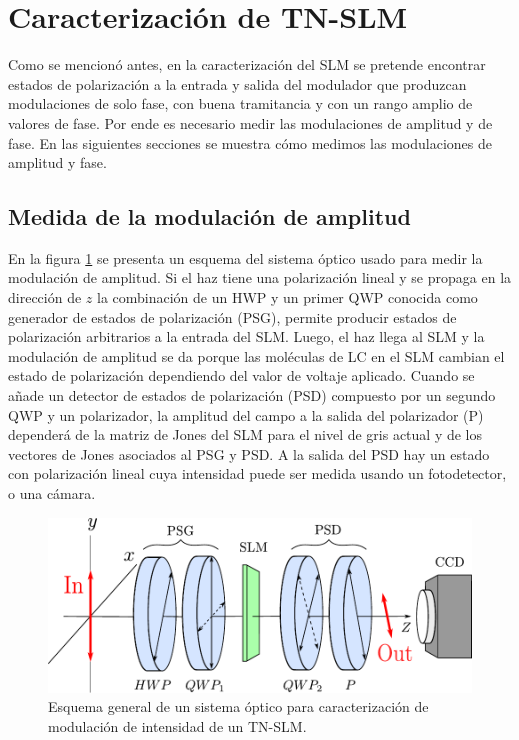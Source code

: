 \section{Caracterización de TN-SLM}
\label{sec:ChGV_Caracterizacion_de_SLM}

Como se mencionó antes, en la caracterización del SLM se pretende
encontrar estados de polarización a la entrada y salida del modulador
que produzcan modulaciones de solo fase, con buena tramitancia y con
un rango amplio de valores de fase. 
Por ende es necesario medir las modulaciones de amplitud y de fase. En
las siguientes secciones se muestra cómo medimos las modulaciones de
amplitud y fase. 

\subsection{Medida de la modulación de amplitud}
\label{sec:ChGV_med_mod_amp}

En la figura \ref{fig:PSG_PSD} se presenta un esquema del sistema
óptico usado para medir la modulación de amplitud. Si el haz tiene una
polarización lineal y se propaga en la dirección de $z$ la combinación
de un HWP y un primer QWP conocida como generador de estados de
polarización (PSG), permite producir estados de polarización
arbitrarios a la entrada del SLM. Luego, el haz llega al SLM y la modulación de amplitud se
da porque las moléculas de LC en el SLM cambian el estado de
polarización dependiendo del valor de voltaje aplicado. Cuando se añade un detector de estados de
polarización (PSD) compuesto por un segundo QWP y un polarizador, la amplitud del campo a la salida del polarizador
(P) dependerá de la matriz de Jones del SLM para el nivel de gris
actual y de los vectores de Jones asociados al PSG y PSD. A la salida
del PSD hay un estado con polarización lineal cuya intensidad puede
ser medida usando un fotodetector, o una cámara. 
 \begin{figure}[h!]
\centering
\includegraphics[scale=.8]{PSG_PSD.pdf}
\caption[Esquema de un sistema generador y analizador de estados de
polarización]{Esquema general de un sistema óptico para
  caracterización de modulación de intensidad de un TN-SLM.}
\label{fig:PSG_PSD}
\end{figure}

